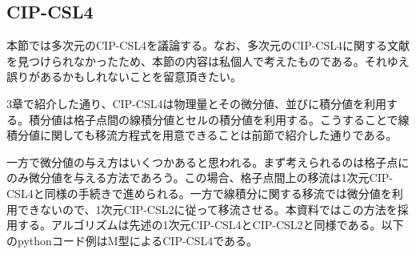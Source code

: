 \documentclass[dvipdfmx, 9pt, a4paper]{jsarticle}
\begin{document}
\subsection{CIP-CSL4}
本節では多次元のCIP-CSL4を議論する。なお、多次元のCIP-CSL4に関する文献を見つけられなかったため、本節の内容は私個人で考えたものである。それゆえ誤りがあるかもしれないことを留意頂きたい。\par
3章で紹介した通り、CIP-CSL4は物理量とその微分値、並びに積分値を利用する。積分値は格子点間の線積分値とセルの積分値を利用する。こうすることで線積分値に関しても移流方程式を用意できることは前節で紹介した通りである。\par
一方で微分値の与え方はいくつかあると思われる。まず考えられるのは格子点にのみ微分値を与える方法であろう。この場合、格子点間上の移流は1次元CIP-CSL4と同様の手続きで進められる。一方で線積分に関する移流では微分値を利用できないので、1次元CIP-CSL2に従って移流させる。本資料ではこの方法を採用する。アルゴリズムは先述の1次元CIP-CSL4とCIP-CSL2と同様である。以下のpythonコード例はM型によるCIP-CSL4である。
\end{document}
